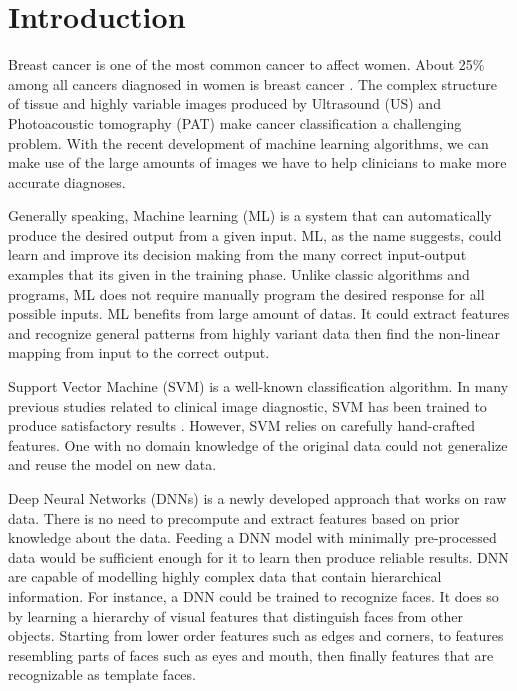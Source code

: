 \chapter{Introduction} %

Breast cancer is one of the most common cancer to affect women. About 25\% among all cancers diagnosed in women is breast cancer \citep{Siegel2015}. The complex structure of tissue and highly variable images produced by Ultrasound (US) and Photoacoustic tomography (PAT) make cancer classification a challenging problem. With the recent development of machine learning algorithms, we can make use of the large amounts of images we have to help clinicians to make more accurate diagnoses. 

Generally speaking, Machine learning (ML) is a system that can automatically produce the desired output from a given input. ML, as the name suggests, could learn and improve its decision making from the many correct input-output examples that its given in the training phase. Unlike classic algorithms and programs, ML does not require manually program the desired response for all possible inputs. ML benefits from large amount of datas. It could extract features and recognize general patterns from highly variant data then find the non-linear mapping from input to the correct output. 

Support Vector Machine (SVM) is a well-known classification algorithm. In many previous studies related to clinical image diagnostic, SVM has been trained to produce satisfactory results \citep{Vassis2015}. However, SVM relies on carefully hand-crafted features. One with no domain knowledge of the original data could not generalize and reuse the model on new data.

Deep Neural Networks (DNNs) \citep{LeCun2015} is a newly developed approach that works on raw data. There is no need to precompute and extract features based on prior knowledge about the data. Feeding a DNN model with minimally pre-processed data would be sufficient enough for it to learn then produce reliable results. DNN are capable of modelling highly complex data that contain hierarchical information. For instance, a DNN could be trained to recognize faces. It does so by learning a hierarchy of visual features that distinguish faces from other objects. Starting from lower order features such as edges and corners, to features resembling parts of faces such as eyes and mouth, then finally features that are recognizable as template faces.

